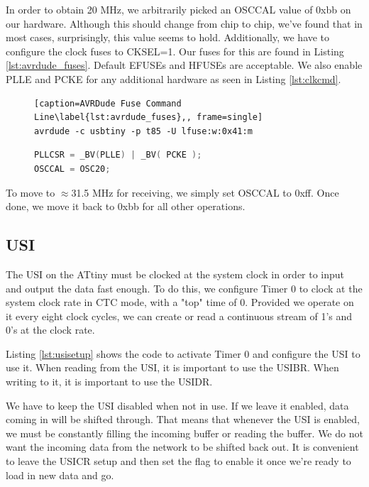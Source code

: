 \documentclass[13pt]{ltxdoc}
\begin{document}
In order to obtain 20 MHz, we arbitrarily picked an OSCCAL value of 0xbb on our
hardware.  Although this should change from chip to chip, we've found that in most
cases, surprisingly, this value seems to hold.  Additionally, we have to configure
the clock fuses to CKSEL=1.  Our fuses for this are found in Listing \ref{lst:avrdude_fuses}.
Default EFUSEs and HFUSEs are acceptable.  We also enable PLLE and PCKE for any additional
hardware as seen in Listing \ref{lst:clkcmd}.

\begin{figure}
\begin{lstlisting}[caption=AVRDude Fuse Command Line\label{lst:avrdude_fuses},, frame=single]
avrdude -c usbtiny -p t85 -U lfuse:w:0x41:m
\end{lstlisting}
\end{figure}

\begin{figure}
\begin{lstlisting}[caption=Clock Setup\label{lst:clkcmd},language=C, frame=single]
PLLCSR = _BV(PLLE) | _BV( PCKE );
OSCCAL = OSC20;
\end{lstlisting}
\end{figure}


To move to $\approx$31.5 MHz for receiving, we simply set OSCCAL to 0xff.  Once done, we move it back to 0xbb for all other operations.

\subsection{USI}
The USI on the ATtiny must be clocked at the system clock in order to input and output the data fast enough.
To do this, we configure Timer 0 to clock at the system clock rate in CTC mode, with a "top" time of 0.
Provided we operate on it every eight clock cycles, we can create or read
a continuous stream of 1's and 0's at the clock rate.

Listing \ref{lst:usisetup} shows the code to activate Timer 0 and configure the USI to use it. 
When reading from the USI, it is important to use the USIBR.  When writing to it, it is important to use the USIDR.

We have to keep the USI disabled when not in use.  If we leave it enabled, data coming in will be shifted through.  
That means that whenever the USI is enabled, we must be constantly filling the incoming buffer or reading the buffer.
We do not want the incoming data from the network to be shifted back out.  It is convenient to leave the USICR setup and then
set the flag to enable it once we're ready to load in new data and go.
\end{document}
